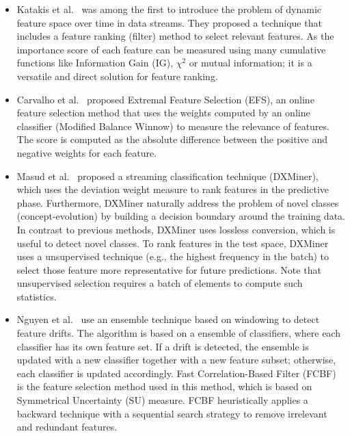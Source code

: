 \documentclass[preprint,12pt]{elsarticle}
\begin{document}
\begin{itemize}
	\item Katakis et al.~\cite{kata05} was among the first to introduce the problem of dynamic feature space over time in data streams. They proposed a technique that includes a feature ranking (filter) method to select relevant features. As the importance score of each feature can be measured using many cumulative functions like Information Gain (IG), $\chi^2$ or mutual information; it is a versatile and direct solution for feature ranking.
	\item Carvalho et al.~\cite{carva06} proposed Extremal Feature Selection (EFS), an online feature selection method that uses the weights computed by an online classifier (Modified Balance Winnow) to measure the relevance of features. The score is computed as the absolute difference between the positive and negative weights for each feature.
	\item Masud et al.~\cite{masud10} proposed a streaming classification technique (DXMiner), which uses the deviation weight measure to rank features in the predictive phase. Furthermore, DXMiner naturally address the problem of novel classes (concept-evolution) by building a decision boundary around the training data. In contrast to previous methods, DXMiner uses lossless conversion, which is useful to detect novel classes. To rank features in the test space, DXMiner uses a unsupervised technique (e.g., the highest frequency in the batch) to select those feature more representative for future predictions. Note that unsupervised selection requires a batch of elements to compute such statistics.
	\item Nguyen et al.~\cite{nguyen12} use an ensemble technique based on windowing to detect feature drifts. The algorithm is based on a ensemble of classifiers, where each classifier has its own feature set. If a drift is detected, the ensemble is updated with a new classifier together with a new feature subset; otherwise, each classifier is updated accordingly. Fast Correlation-Based Filter (FCBF) is the feature selection method used in this method, which is based on Symmetrical Uncertainty (SU) measure. FCBF heuristically applies a backward technique with a sequential search strategy to remove irrelevant and redundant features.

\end{itemize}
\end{document}
